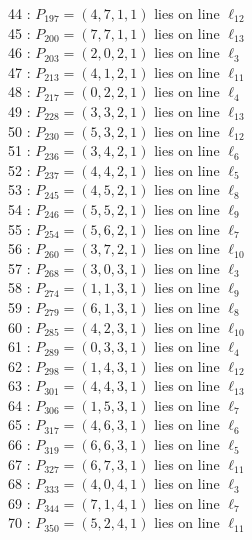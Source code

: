 \documentclass{article}
\begin{document}
{\begin{multicols}{2}
44 : $P_{197}=( 4, 7, 1, 1 )$ lies on line $\ell_{12}$\\
45 : $P_{200}=( 7, 7, 1, 1 )$ lies on line $\ell_{13}$\\
46 : $P_{203}=( 2, 0, 2, 1 )$ lies on line $\ell_{3}$\\
47 : $P_{213}=( 4, 1, 2, 1 )$ lies on line $\ell_{11}$\\
48 : $P_{217}=( 0, 2, 2, 1 )$ lies on line $\ell_{4}$\\
49 : $P_{228}=( 3, 3, 2, 1 )$ lies on line $\ell_{13}$\\
50 : $P_{230}=( 5, 3, 2, 1 )$ lies on line $\ell_{12}$\\
51 : $P_{236}=( 3, 4, 2, 1 )$ lies on line $\ell_{6}$\\
52 : $P_{237}=( 4, 4, 2, 1 )$ lies on line $\ell_{5}$\\
53 : $P_{245}=( 4, 5, 2, 1 )$ lies on line $\ell_{8}$\\
54 : $P_{246}=( 5, 5, 2, 1 )$ lies on line $\ell_{9}$\\
55 : $P_{254}=( 5, 6, 2, 1 )$ lies on line $\ell_{7}$\\
56 : $P_{260}=( 3, 7, 2, 1 )$ lies on line $\ell_{10}$\\
57 : $P_{268}=( 3, 0, 3, 1 )$ lies on line $\ell_{3}$\\
58 : $P_{274}=( 1, 1, 3, 1 )$ lies on line $\ell_{9}$\\
59 : $P_{279}=( 6, 1, 3, 1 )$ lies on line $\ell_{8}$\\
60 : $P_{285}=( 4, 2, 3, 1 )$ lies on line $\ell_{10}$\\
61 : $P_{289}=( 0, 3, 3, 1 )$ lies on line $\ell_{4}$\\
62 : $P_{298}=( 1, 4, 3, 1 )$ lies on line $\ell_{12}$\\
63 : $P_{301}=( 4, 4, 3, 1 )$ lies on line $\ell_{13}$\\
64 : $P_{306}=( 1, 5, 3, 1 )$ lies on line $\ell_{7}$\\
65 : $P_{317}=( 4, 6, 3, 1 )$ lies on line $\ell_{6}$\\
66 : $P_{319}=( 6, 6, 3, 1 )$ lies on line $\ell_{5}$\\
67 : $P_{327}=( 6, 7, 3, 1 )$ lies on line $\ell_{11}$\\
68 : $P_{333}=( 4, 0, 4, 1 )$ lies on line $\ell_{3}$\\
69 : $P_{344}=( 7, 1, 4, 1 )$ lies on line $\ell_{7}$\\
70 : $P_{350}=( 5, 2, 4, 1 )$ lies on line $\ell_{11}$\\

\end{multicols}}
\end{document}
